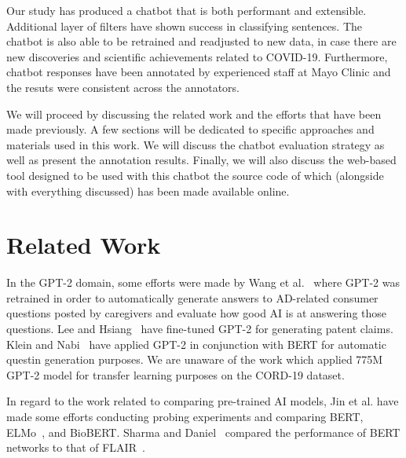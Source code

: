 \documentclass[sigconf,natbib=false]{acmart}
\begin{document}
\bigskip

\noindent Our study has produced a chatbot that is both performant and
extensible. Additional layer of filters have shown success in classifying
sentences. The chatbot is also able to be retrained and readjusted to new data,
in case there are new discoveries and scientific achievements related to
COVID-19. Furthermore, chatbot responses have been annotated by experienced
staff at Mayo Clinic and the resuts were consistent across the annotators.

\bigskip

\noindent We will proceed by discussing the related work and the efforts that
have been made previously. A few sections will be dedicated to specific
approaches and materials used in this work. We will discuss the chatbot
evaluation strategy as well as present the annotation results. Finally, we will
also discuss the web-based tool designed to be used with this chatbot the
source code of which (alongside with everything discussed) has been made
available online.


\section{Related Work}

In the GPT-2 domain, some efforts were made by Wang et al.~\cite{gpt2-ad} where GPT-2
was retrained in order to automatically generate answers to AD-related consumer
questions posted by caregivers and evaluate how good  AI is at answering those
questions. Lee and Hsiang~\cite{lee-hsiang} have fine-tuned GPT-2 for
generating patent claims.  Klein and Nabi~\cite{klein-nabi} have applied GPT-2
in conjunction with BERT for automatic questin generation purposes. We are
unaware of the work which applied 775M GPT-2 model for transfer learning
purposes on the CORD-19 dataset.

\bigskip

\noindent In regard to the work related to comparing pre-trained AI models,
Jin et al. have made some efforts conducting probing experiments and comparing
BERT, ELMo~\cite{elmo}, and BioBERT. Sharma and Daniel~\cite{bioflair} compared
the performance of BERT networks to that of FLAIR~\cite{akbik2018coling}.

\bigskip
\end{document}
